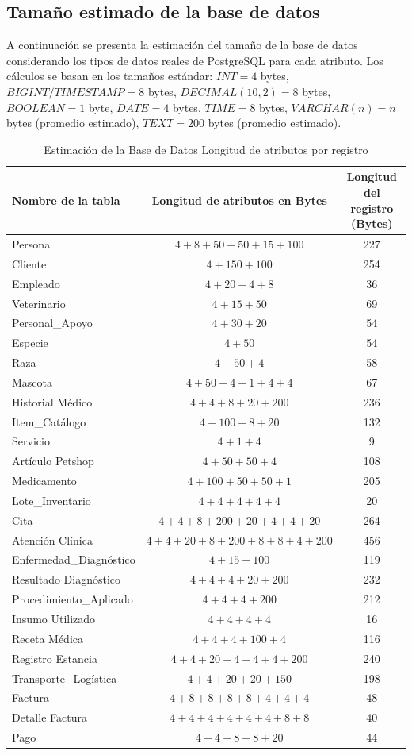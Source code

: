 \subsection{Tamaño estimado de la base de datos}

A continuación se presenta la estimación del tamaño de la base de datos considerando los tipos de datos reales de PostgreSQL para cada atributo. Los cálculos se basan en los tamaños estándar: $INT=4$ bytes, $BIGINT/TIMESTAMP=8$ bytes, $DECIMAL(10,2)=8$ bytes, $BOOLEAN=1$ byte, $DATE=4$ bytes, $TIME=8$ bytes, $VARCHAR(n)=n$ bytes (promedio estimado), $TEXT=200$ bytes (promedio estimado).

\begin{table}[H]
\centering
\footnotesize
\begin{tabular}{lcc}
\toprule
\textbf{Nombre de la tabla} & \textbf{Longitud de atributos en Bytes} & \textbf{Longitud del registro (Bytes)} \\
\midrule
Persona & $4+8+50+50+15+100$ & 227 \\
Cliente & $4+150+100$ & 254 \\
Empleado & $4+20+4+8$ & 36 \\
Veterinario & $4+15+50$ & 69 \\
Personal\_Apoyo & $4+30+20$ & 54 \\
Especie & $4+50$ & 54 \\
Raza & $4+50+4$ & 58 \\
Mascota & $4+50+4+1+4+4$ & 67 \\
Historial Médico & $4+4+8+20+200$ & 236 \\
Item\_Catálogo & $4+100+8+20$ & 132 \\
Servicio & $4+1+4$ & 9 \\
Artículo Petshop & $4+50+50+4$ & 108 \\
Medicamento & $4+100+50+50+1$ & 205 \\
Lote\_Inventario & $4+4+4+4+4$ & 20 \\
Cita & $4+4+8+200+20+4+4+20$ & 264 \\
Atención Clínica & $4+4+20+8+200+8+8+4+200$ & 456 \\
Enfermedad\_Diagnóstico & $4+15+100$ & 119 \\
Resultado Diagnóstico & $4+4+4+20+200$ & 232 \\
Procedimiento\_Aplicado & $4+4+4+200$ & 212 \\
Insumo Utilizado & $4+4+4+4$ & 16 \\
Receta Médica & $4+4+4+100+4$ & 116 \\
Registro Estancia & $4+4+20+4+4+4+200$ & 240 \\
Transporte\_Logística & $4+4+20+20+150$ & 198 \\
Factura & $4+8+8+8+8+4+4+4$ & 48 \\
Detalle Factura & $4+4+4+4+4+4+8+8$ & 40 \\
Pago & $4+4+8+8+20$ & 44 \\
\bottomrule
\end{tabular}
\caption{Estimación de la Base de Datos Longitud de atributos por registro}
\end{table}

